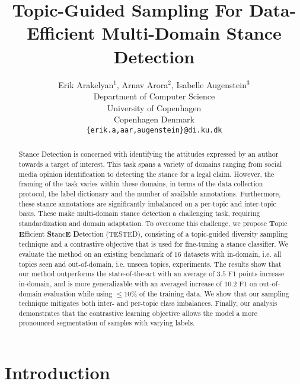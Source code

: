 \documentclass[11pt]{article}
\title{Topic-Guided Sampling For Data-Efficient Multi-Domain Stance Detection}
\author{Erik Arakelyan$^{1}$, Arnav Arora$^{2}$, Isabelle Augenstein$^{3}$ \\
Department of Computer Science\\
University of Copenhagen \\
Copenhagen Denmark  \\ 
\texttt{\{erik.a,aar,augenstein\}@di.ku.dk} 
}
\begin{document}
\maketitle
\begin{abstract}

Stance Detection is concerned with identifying the attitudes expressed by an author towards a target of interest. This task spans a variety of domains ranging from social media opinion identification to detecting the stance for a legal claim. However, the framing of the task varies within these domains, in terms of the data collection protocol, the label dictionary and the number of available annotations. Furthermore, these stance annotations are significantly imbalanced on a per-topic and inter-topic basis. These make multi-domain stance detection a challenging task, requiring standardization and domain adaptation. To overcome this challenge, we propose \textbf{T}opic \textbf{E}fficient \textbf{St}anc\textbf{E} \textbf{D}etection	(TESTED), consisting of a topic-guided diversity sampling technique and a contrastive objective that is used for fine-tuning a stance classifier. We evaluate the method on an existing benchmark of $16$ datasets with in-domain, i.e. all topics seen and out-of-domain, i.e. unseen topics, experiments. The results show that our method outperforms the state-of-the-art with an average of $3.5$ F1 points increase in-domain, and is more generalizable with an averaged increase of $10.2$ F1 on out-of-domain evaluation while using $\leq10\%$ of the training data. We show that our sampling technique  mitigates both inter- and per-topic class imbalances. Finally, our analysis demonstrates that the contrastive learning objective allows the model a more pronounced segmentation of samples with varying labels.






\end{abstract}

\section{Introduction}
\label{sec:intro}
\end{document}

